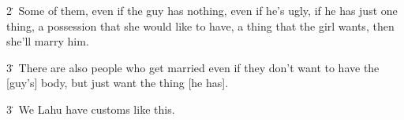 2\. Some of them, even if the guy has nothing, even if he's ugly, if he has just one thing, a possession that she would like to have, a thing that the girl wants, then she'll marry him.

3\. There are also people who get married even if they don't want to have the [guy’s] body, but just want the thing [he has].

3\. We Lahu have customs like this.












